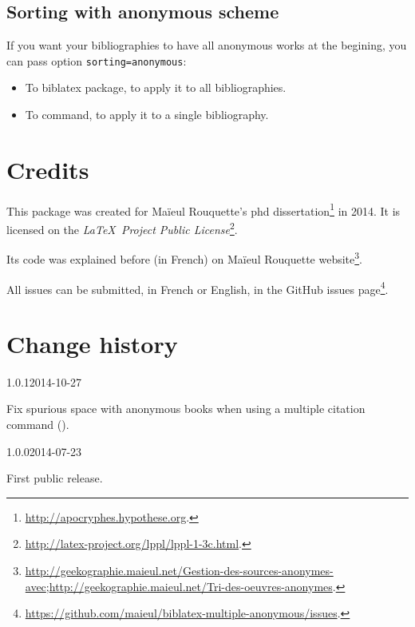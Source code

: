 \documentclass{ltxdockit}[2011/03/25]
\newcommand{\biblatex}{biblatex\xspace}
\begin{document}
\subsection{Sorting with anonymous scheme}

If you want your bibliographies to have all anonymous works at the begining, you can pass option \verb+sorting=anonymous+:

\begin{itemize}
	\item To \biblatex package, to apply it to all bibliographies.
	\item To  command, to apply it to a single bibliography.
\end{itemize}
\section{Credits}

This package was created for Maïeul Rouquette's phd dissertation\footnote{\url{http://apocryphes.hypothese.org}.} in 2014. It is licensed on the \emph{\LaTeX\ Project Public License}\footnote{\url{http://latex-project.org/lppl/lppl-1-3c.html}.}. 

Its code was explained before (in French) on Maïeul Rouquette website\footnote{\url{http://geekographie.maieul.net/Gestion-des-sources-anonymes-avec};\url{http://geekographie.maieul.net/Tri-des-oeuvres-anonymes}.}.

All issues can be submitted, in French or English, in the GitHub issues page\footnote{\url{https://github.com/maieul/biblatex-multiple-anonymous/issues}.}.

\section{Change history}

\begin{changelog}


\begin{release}{1.0.1}{2014-10-27}
\item Fix spurious space with anonymous books when using a multiple citation command ().
\end{release}

\begin{release}{1.0.0}{2014-07-23}
\item First public release.
\end{release}
\end{changelog}
\end{document}

